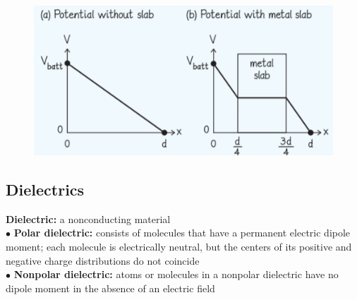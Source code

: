         \begin{figure}[hbt!]
            \centering
            \includegraphics[scale = 0.75]{Resources/26.2_Metal_Slab_2}
        \end{figure}

    \subsection{Dielectrics}    %

        \textbf{Dielectric:} a nonconducting material \\
        $\bullet$ \textbf{Polar dielectric:} consists of molecules that have a permanent electric dipole moment; each molecule is electrically neutral, but the centers of its positive and negative charge distributions do
        not coincide \\
        $\bullet$ \textbf{Nonpolar dielectric:} atoms or molecules in a nonpolar dielectric have no dipole moment in the absence of an electric field

